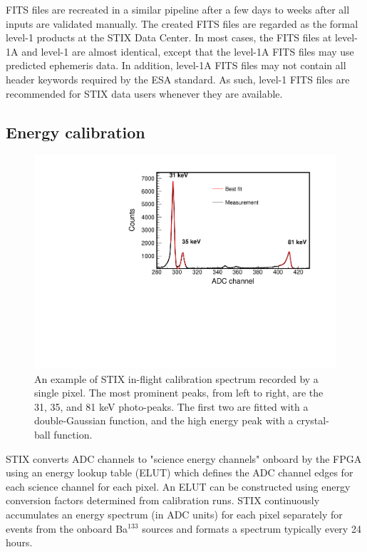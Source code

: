 \documentclass[referee]{aa} %
\begin{document}
FITS files are recreated 
in a similar pipeline after a few days to weeks after all inputs are validated manually. The created FITS files are regarded as the formal level-1 products at the STIX Data Center. 
In most cases, the FITS files at level-1A and level-1 are almost identical, except that the level-1A FITS files may use predicted ephemeris data. In addition, level-1A FITS files may not contain all header keywords required by the ESA standard.  As such, level-1 FITS files are recommended for STIX data users whenever they are available. 

\subsection{Energy calibration}
\begin{figure}
 \centering
  \includegraphics[width=0.8\linewidth]{figures/cal-fit.pdf}
  \caption{An example of  STIX in-flight calibration spectrum recorded by a single pixel.
  The most prominent peaks, from left to right, are the 31, 35, and 81 keV photo-peaks. The first two are fitted with a double-Gaussian function, and the high energy peak with a crystal-ball function. }
    \label{fig:cal-fit}
\end{figure}
STIX converts ADC channels to "science energy channels" onboard by the FPGA using an energy lookup table (ELUT) 
which defines the ADC channel edges for each science channel for each pixel.
An ELUT can be constructed using energy conversion factors determined from calibration runs. 
STIX continuously accumulates an energy spectrum (in ADC units) for each pixel separately for events from the onboard Ba$^{133}$ sources and formats a spectrum typically every 24 hours. 
\end{document}
